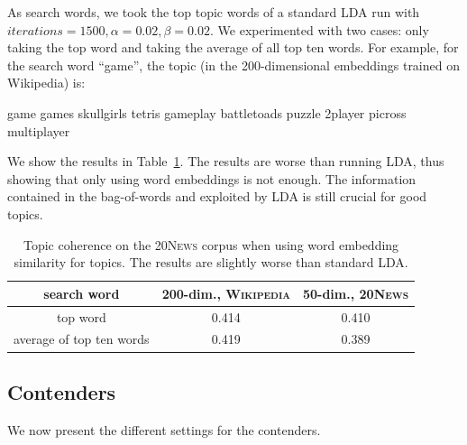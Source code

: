 \documentclass[
        a4paper,
        titlepage,
        twoside,
        parskip,
        numbers=noenddot
        ]{scrbook}
\newcommand{\ra}[1]{\renewcommand{\arraystretch}{#1}}
\newcommand{\topicbox}[1]{
  \setlength{\OuterFrameSep}{0pt}
  \begin{framed}
    #1
  \end{framed}
}
\theoremstyle{break}
\begin{document}
As search words, we took the top topic words of a standard LDA run with $iterations=1500, \alpha=0.02, \beta=0.02$.
We experimented with two cases: only taking the top word and taking the average of all top ten words.
For example, for the search word ``game'', the topic (in the 200-dimensional embeddings trained on Wikipedia) is:
\topicbox{\noindent game games skullgirls tetris gameplay battletoads puzzle 2player picross multiplayer}

We show the results in Table~\ref{table:raw_we_tm}.
The results are worse than running LDA, thus showing that only using word embeddings is not enough.
The information contained in the bag-of-words and exploited by LDA is still crucial for good topics.
\begin{table}[]
  \ra{1.3}
  \centering
  \caption{Topic coherence on the \textsc{20News} corpus when using word embedding similarity for topics. The results are slightly worse than standard LDA.}
  \label{table:raw_we_tm}
  \begin{tabular}{ccc}
    \toprule
    search word     & 200-dim., \textsc{Wikipedia} & 50-dim., \textsc{20News} \\
    \midrule
    top word                 & 0.414                        & 0.410                    \\
    average of top ten words & 0.419                        & 0.389 \\
    \bottomrule
  \end{tabular}
\end{table}

\subsection{Contenders}
We now present the different settings for the contenders.
\end{document}
